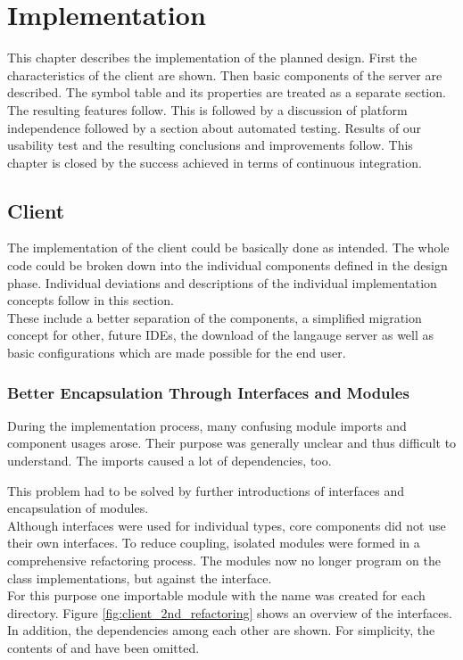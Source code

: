 \section{Implementation}
This chapter describes the implementation of the planned design.
First the characteristics of the client are shown.
Then basic components of the server are described.
The symbol table and its properties are treated as a separate section.
The resulting features follow.
This is followed by a discussion of platform independence followed by a section about automated testing.
Results of our usability test and the resulting conclusions and improvements follow.
This chapter is closed by the success achieved in terms of continuous integration.

\subsection{Client}
The implementation of the client could be basically done as intended.
The whole code could be broken down into the individual components defined in the design phase.
Individual deviations and descriptions of the individual implementation concepts follow in this section. \\

These include a better separation of the components,
a simplified migration concept for other, future IDEs,
the download of the langauge server
as well as basic configurations which are made possible for the end user.

\subsubsection{Better Encapsulation Through Interfaces and Modules}
During the implementation process, many confusing module imports and component usages arose.
Their purpose was generally unclear and thus difficult to understand.
The imports caused a lot of dependencies, too.

This problem had to be solved by further introductions of interfaces and encapsulation of modules. \\

Although interfaces were used for individual types,
core components did not use their own interfaces.
To reduce coupling, isolated modules were formed in a comprehensive refactoring process.
The modules now no longer program on the class implementations, but against the interface. \\

For this purpose one importable module with the name  was created for each directory.
Figure \ref{fig:client_2nd_refactoring} shows an overview of the interfaces.
In addition, the dependencies among each other are shown.
For simplicity, the contents of  and  have been omitted. \\

